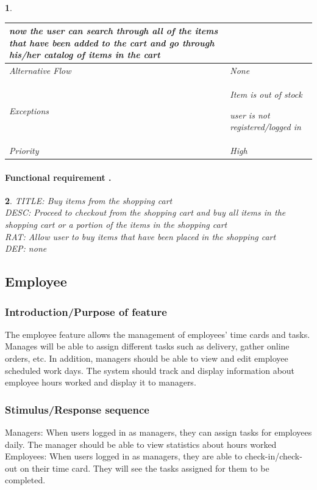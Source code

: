 \documentclass{scrreprt}
\theoremstyle{funreq}
\newtheorem{funreq}{}
\begin{document}
\begin{funreq}
\begin{table}[!htb]
{\begin{tabularx}{\columnwidth}{|l|X|}
					now the user can search through all of the items that have been added to the cart and go through his/her catalog of items in the cart \\ \hline
					Alternative Flow & None                                       \\ \hline
					Exceptions       & Item is out of stock
					
					user is not registered/logged in \\ \hline
					Priority         & High                                       \\ \hline
				\end{tabularx}%
			}
		\end{table}
	\end{funreq}

	
	\paragraph[]{Functional requirement .}
	\begin{funreq}
		\label{card_buy}
		TITLE: Buy items from the shopping cart\\
		DESC: Proceed to checkout from the shopping cart and buy all items in the shopping cart or a portion of the items in the shopping cart\\
		RAT: Allow user to buy items that have been placed in the shopping cart\\
		DEP: none
	\end{funreq}
	
	
	\subsection{Employee}
	\subsubsection{Introduction/Purpose of feature}
	The employee feature allows the management of employees’ time cards and tasks. Manages will be able to assign different tasks such as delivery, gather online orders, etc.  In addition, managers should be able to view and edit employee scheduled work days.  The system should track and display information about employee hours worked and display it to managers.
	
	
	\subsubsection{Stimulus/Response sequence}
	Managers:
	When users logged in as managers, they can assign tasks for employees daily.  The manager should be able to view statistics about hours worked
	Employees:
	When users logged in as managers, they are able to check-in/check-out on their time card. They will see the tasks assigned for them to be completed.
	
\end{document}
